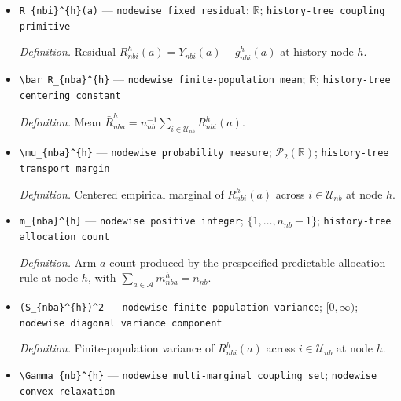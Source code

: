 \documentclass{article}
\begin{document}
\begin{itemize}
  \par\smallskip\noindent\emph{Definition.} Value produced for unit \(i\) and arm \(a\) by the fixed predictable fitting rule when the pre-block history is \(h\).
  \item \texttt{R\_\allowbreak{}\{nbi\}\allowbreak{}\textasciicircum{}\{h\}\allowbreak{}(a)} --- \texttt{nodewise fixed residual}; \(\mathbb R\); \texttt{history-\allowbreak{}tree coupling primitive}
  \par\smallskip\noindent\emph{Definition.} Residual \(R_{nbi}^{h}(a)=Y_{nbi}(a)-g_{nbi}^{h}(a)\) at history node \(h\).
  \item \texttt{\textbackslash{}\allowbreak{}bar R\_\allowbreak{}\{nba\}\allowbreak{}\textasciicircum{}\{h\}\allowbreak{}} --- \texttt{nodewise finite-\allowbreak{}population mean}; \(\mathbb R\); \texttt{history-\allowbreak{}tree centering constant}
  \par\smallskip\noindent\emph{Definition.} Mean \(\bar R_{nba}^{h}=n_{nb}^{-1}\sum_{i\in\mathcal U_{nb}}R_{nbi}^{h}(a)\).
  \item \texttt{\textbackslash{}\allowbreak{}mu\_\allowbreak{}\{nba\}\allowbreak{}\textasciicircum{}\{h\}\allowbreak{}} --- \texttt{nodewise probability measure}; \(\mathcal P_2(\mathbb R)\); \texttt{history-\allowbreak{}tree transport margin}
  \par\smallskip\noindent\emph{Definition.} Centered empirical marginal of \(R_{nbi}^{h}(a)\) across \(i\in\mathcal U_{nb}\) at node \(h\).
  \item \texttt{m\_\allowbreak{}\{nba\}\allowbreak{}\textasciicircum{}\{h\}\allowbreak{}} --- \texttt{nodewise positive integer}; \(\{1,\ldots,n_{nb}-1\}\); \texttt{history-\allowbreak{}tree allocation count}
  \par\smallskip\noindent\emph{Definition.} Arm-\(a\) count produced by the prespecified predictable allocation rule at node \(h\), with \(\sum_{a\in\mathcal A}m_{nba}^{h}=n_{nb}\).
  \item \texttt{(S\_\allowbreak{}\{nba\}\allowbreak{}\textasciicircum{}\{h\}\allowbreak{})\textasciicircum{}2} --- \texttt{nodewise finite-\allowbreak{}population variance}; \([0,\infty)\); \texttt{nodewise diagonal variance component}
  \par\smallskip\noindent\emph{Definition.} Finite-population variance of \(R_{nbi}^{h}(a)\) across \(i\in\mathcal U_{nb}\) at node \(h\).
  \item \texttt{\textbackslash{}\allowbreak{}Gamma\_\allowbreak{}\{nb\}\allowbreak{}\textasciicircum{}\{h\}\allowbreak{}} --- \texttt{nodewise multi-\allowbreak{}marginal coupling set}; \texttt{nodewise convex relaxation}

\end{itemize}
\end{document}
